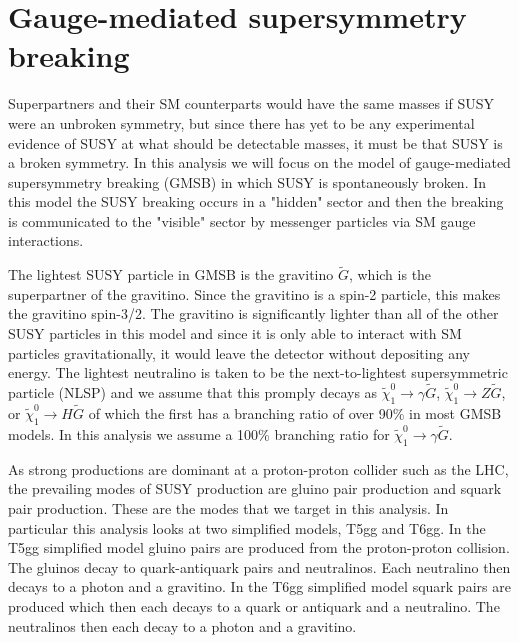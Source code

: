 \section{Gauge-mediated supersymmetry breaking}

Superpartners and their SM counterparts would have the same masses if SUSY were an unbroken symmetry, but since there has yet to be any experimental evidence of SUSY at what should be detectable masses, it must be that SUSY is a broken symmetry.  In this analysis we will focus on the model of gauge-mediated supersymmetry breaking (GMSB) in which SUSY is spontaneously broken.  In this model the SUSY breaking occurs in a "hidden" sector and then the breaking is communicated to the "visible" sector by messenger particles via SM gauge interactions\cite{Martin:1997ns}.  

The lightest SUSY particle in GMSB is the gravitino $\tilde{G}$, which is the superpartner of the gravitino.  Since the gravitino is a spin-2 particle, this makes the gravitino spin-3/2.  The gravitino is significantly lighter than all of the other SUSY particles in this model and since it is only able to interact with SM particles gravitationally, it would leave the detector without depositing any energy.  The lightest neutralino is taken to be the next-to-lightest supersymmetric particle (NLSP) and we assume that this promply decays as $\tilde{\chi}_1^0 \rightarrow \gamma \tilde{G}$, $\tilde{\chi}_1^0 \rightarrow Z \tilde{G}$, or $\tilde{\chi}_1^0 \rightarrow H \tilde{G}$ of which the first has a branching ratio of over 90\% in most GMSB models\cite{Terwort:2008ii}.  In this analysis we assume a 100\% branching ratio for $\tilde{\chi}_1^0 \rightarrow \gamma \tilde{G}$.  

As strong productions are dominant at a proton-proton collider such as the LHC, the prevailing modes of SUSY production are gluino pair production and squark pair production.  These are the modes that we target in this analysis.  In particular this analysis looks at two simplified models, T5gg and T6gg.  In the T5gg simplified model gluino pairs are produced from the proton-proton collision.  The gluinos decay to quark-antiquark pairs and neutralinos.  Each neutralino then decays to a photon and a gravitino.  In the T6gg simplified model squark pairs are produced which then each decays to a quark or antiquark and a neutralino.  The neutralinos then each decay to a photon and a gravitino.



